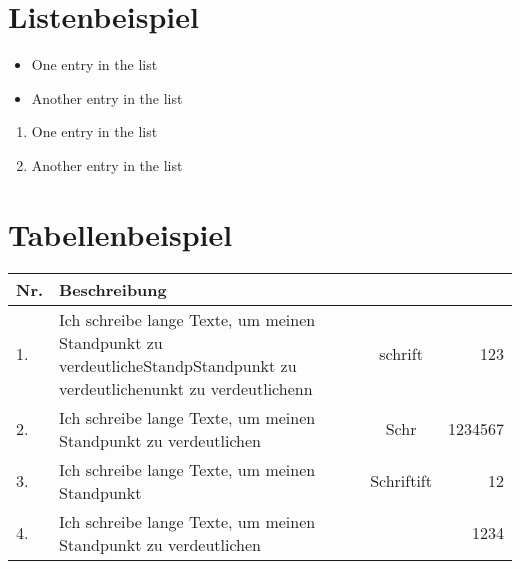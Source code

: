 \documentclass[10pt,a4paper]{article}
\begin{document}

\tableofcontents
\newpage
\listoffigures
\newpage
\listoftables
\newpage
{}

\section{Listenbeispiel}
    \begin{itemize}
        \item One entry in the list
        \item Another entry in the list
    \end{itemize}
    \begin{enumerate}
        \item One entry in the list
        \item Another entry in the list
    \end{enumerate}

\section{Tabellenbeispiel}
    \begin{tabularx}{\textwidth}{|l|X|c|r|}
        \hline
        \textbf{Nr.} & \textbf{Beschreibung} & &\\
        \hline
        1. & Ich schreibe lange Texte, um meinen Standpunkt zu verdeutlicheStandpStandpunkt zu verdeutlichenunkt zu verdeutlichenn  & schrift  &  123 \\
        \hline
        2. & Ich schreibe lange Texte, um meinen Standpunkt zu verdeutlichen  & Schr  &   1234567 \\
        \hline
        3. & Ich schreibe lange Texte, um meinen Standpunkt   & Schriftift  &   12 \\
        \hline
        4. & Ich schreibe lange Texte, um meinen Standpunkt zu verdeutlichen  &   &   1234 \\
        \hline
    \end{tabularx}
\end{document}
